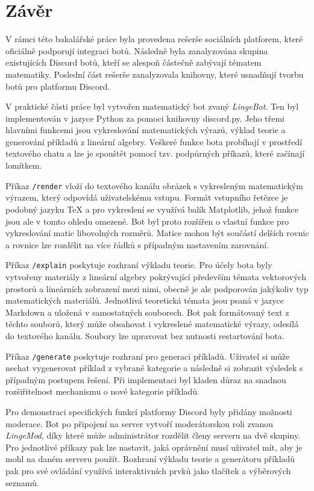 \documentclass[FM]{tulthesis}
\begin{document}
	
	\chapter{Závěr}
	
	V rámci této bakalářské práce byla provedena rešerše sociálních platforem, které oficiálně podporují integraci botů. Následně byla zanalyzována skupina existujících Discord botů, kteří se alespoň částečně zabývají tématem matematiky. Poslední část rešerše zanalyzovala knihovny, které usnadňují tvorbu botů pro platformu Discord.
	
	V praktické části práce byl vytvořen matematický bot zvaný \textit{LingeBot}. Ten byl implementován v jazyce Python za pomoci knihovny discord.py. Jeho třemi hlavními funkcemi jsou vykreslování matematických výrazů, výklad teorie a generování příkladů z lineární algebry. Veškeré funkce bota probíhají v prostředí textového chatu a lze je spouštět pomocí tzv. podpůrných příkazů, které začínají lomítkem.
	
	Příkaz \verb|/render| vloží do textového kanálu obrázek s vykresleným matematickým výrazem, který odpovídá uživatelskému vstupu. Formát vstupního řetězce je podobný jazyku TeX a pro vykreslení se využívá balík Matplotlib, jehož funkce jsou ale v tomto ohledu omezené. Bot byl proto rozšířen o vlastní funkce pro vykreslování matic libovolných rozměrů. Matice mohou být součástí delších rovnic a rovnice lze rozdělit na více řádků s případným nastavením zarovnání.
	
	Příkaz \verb|/explain| poskytuje rozhraní výkladu teorie. Pro účely bota byly vytvořeny materiály z lineární algebry pokrývající především témata vektorových prostorů a lineárních zobrazení mezi nimi, obecně je ale podporován jakýkoliv typ matematických materiálů. Jednotlivá teoretická témata jsou psaná v jazyce Markdown a uložená v samostatných souborech. Bot pak formátovaný text z těchto souborů, který může obsahovat i vykreslené matematické výrazy, odesílá do textového kanálu. Soubory lze upravovat bez nutnosti restartování bota.
	
	Příkaz \verb|/generate| poskytuje rozhraní pro generaci příkladů. Uživatel si může nechat vygenerovat příklad z vybrané kategorie a následně si zobrazit výsledek s případným postupem řešení. Při implementaci byl kladen důraz na snadnou rozšiřitelnost mechanismu o nové kategorie příkladů.
	
	Pro demonstraci specifických funkcí platformy Discord byly přidány možnosti moderace. Bot po připojení na server vytvoří moderátorskou roli zvanou \textit{LingeMod}, díky které může administrátor rozdělit členy serveru na dvě skupiny. Pro jednotlivé příkazy pak lze nastavit, jaká oprávnění musí uživatel mít, aby je mohl na daném serveru použít. Rozhraní výkladu teorie a generátoru příkladů pak pro své ovládání využívá interaktivních prvků jako tlačítek a výběrových seznamů.
	
\end{document}

